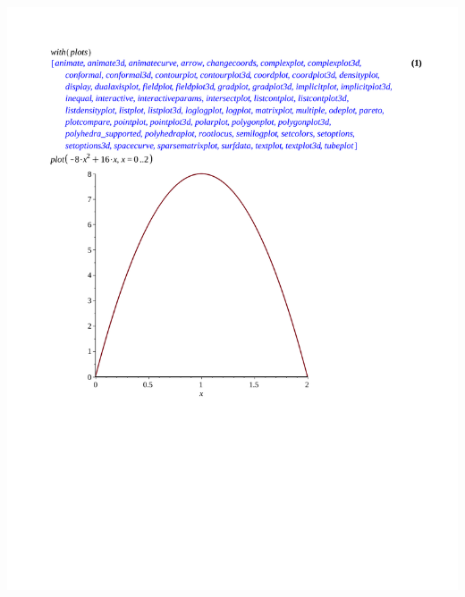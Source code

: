 \documentclass[12pt]{article}
\begin{document}
\begin{enumerate}
\begin{enumerate}
\begin{center}
\includegraphics[scale=0.5]{graph2.pdf}
\end{center}


\end{enumerate}
\end{enumerate}
\end{document}

